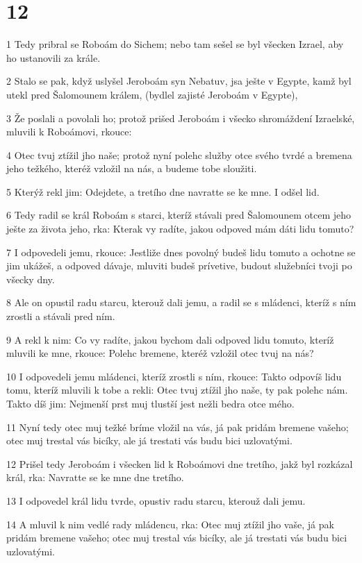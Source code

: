 \chapter{12}

\par 1 Tedy pribral se Roboám do Sichem; nebo tam sešel se byl všecken Izrael, aby ho ustanovili za krále.
\par 2 Stalo se pak, když uslyšel Jeroboám syn Nebatuv, jsa ješte v Egypte, kamž byl utekl pred Šalomounem králem, (bydlel zajisté Jeroboám v Egypte),
\par 3 Že poslali a povolali ho; protož prišed Jeroboám i všecko shromáždení Izraelské, mluvili k Roboámovi, rkouce:
\par 4 Otec tvuj ztížil jho naše; protož nyní polehc služby otce svého tvrdé a bremena jeho težkého, kteréž vzložil na nás, a budeme tobe sloužiti.
\par 5 Kterýž rekl jim: Odejdete, a tretího dne navratte se ke mne. I odšel lid.
\par 6 Tedy radil se král Roboám s starci, kteríž stávali pred Šalomounem otcem jeho ješte za života jeho, rka: Kterak vy radíte, jakou odpoved mám dáti lidu tomuto?
\par 7 I odpovedeli jemu, rkouce: Jestliže dnes povolný budeš lidu tomuto a ochotne se jim ukážeš, a odpoved dávaje, mluviti budeš prívetive, budout služebníci tvoji po všecky dny.
\par 8 Ale on opustil radu starcu, kterouž dali jemu, a radil se s mládenci, kteríž s ním zrostli a stávali pred ním.
\par 9 A rekl k nim: Co vy radíte, jakou bychom dali odpoved lidu tomuto, kteríž mluvili ke mne, rkouce: Polehc bremene, kteréž vzložil otec tvuj na nás?
\par 10 I odpovedeli jemu mládenci, kteríž zrostli s ním, rkouce: Takto odpovíš lidu tomu, kteríž mluvili k tobe a rekli: Otec tvuj ztížil jho naše, ty pak polehc nám. Takto díš jim: Nejmenší prst muj tlustší jest nežli bedra otce mého.
\par 11 Nyní tedy otec muj težké bríme vložil na vás, já pak pridám bremene vašeho; otec muj trestal vás bicíky, ale já trestati vás budu bici uzlovatými.
\par 12 Prišel tedy Jeroboám i všecken lid k Roboámovi dne tretího, jakž byl rozkázal král, rka: Navratte se ke mne dne tretího.
\par 13 I odpovedel král lidu tvrde, opustiv radu starcu, kterouž dali jemu.
\par 14 A mluvil k nim vedlé rady mládencu, rka: Otec muj ztížil jho vaše, já pak pridám bremene vašeho; otec muj trestal vás bicíky, ale já trestati vás budu bici uzlovatými.
